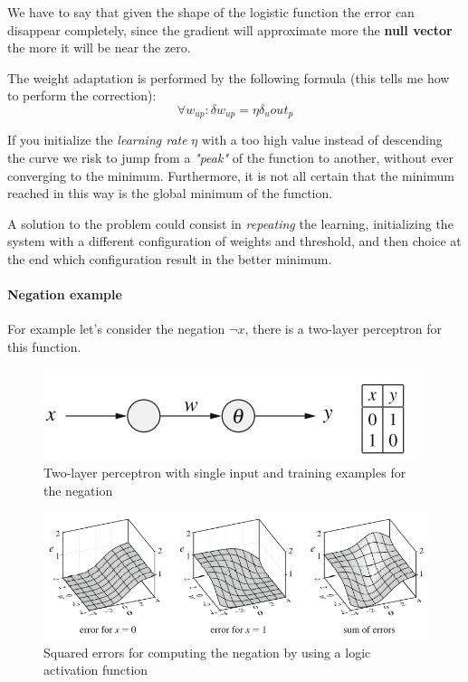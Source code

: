 \documentclass{article}
\begin{document}
We have to say that given the shape of the logistic function the error can disappear
completely, since the gradient will approximate more the \textbf{null vector} the
more it will be near the zero.

The weight adaptation is performed by the following formula (this tells me how to perform the correction):
$$\forall w_{up}:\delta w_{up}=\eta \delta_u out_p$$

If you initialize the \textit{learning rate} $\eta$ with a too high value instead
of descending the curve we risk to jump from a \textit{"peak"} of the function to another,
without ever converging to the minimum. Furthermore, it is not all certain that the minimum
reached in this way is the global minimum of the function.

A solution to the problem could consist in \textit{repeating} the learning, initializing
the system with a different configuration of weights and threshold, and then choice
at the end which configuration result in the better minimum.
\paragraph{Negation example}
For example let's consider the negation $\lnot x$, there is a two-layer perceptron for this function.
\begin{figure}[H]
    \centering
    \includegraphics[scale=0.5]{images/2_per_neg.png}
    \caption{Two-layer perceptron with single input and training examples for the negation}
\end{figure}

\begin{figure}[H]
    \centering
    \includegraphics[scale=0.55]{images/squared_errors.png}
    \caption{Squared errors for computing the negation by using a logic activation function}
\end{figure}
\end{document}
